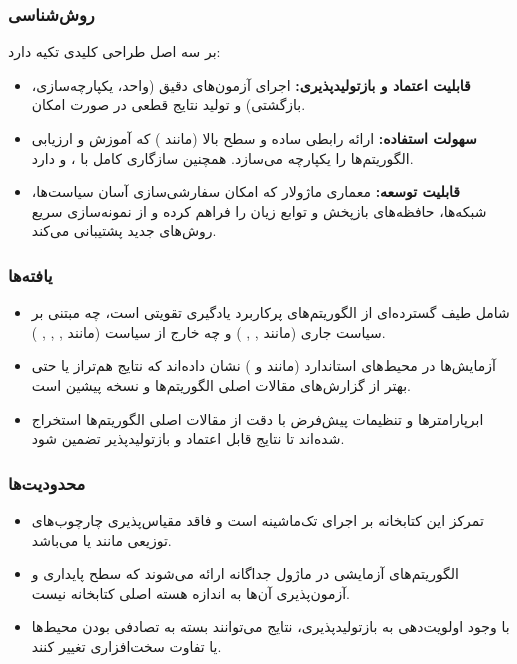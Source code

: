 \documentclass[12pt, a4paper]{report}
\begin{document}
\subsubsection{روش‌شناسی}
 بر سه اصل طراحی کلیدی تکیه دارد:
\begin{itemize}
    \item \textbf{قابلیت اعتماد و بازتولیدپذیری:} اجرای آزمون‌های دقیق (واحد، یکپارچه‌سازی، بازگشتی) و تولید نتایج قطعی در صورت امکان.
    \item \textbf{سهولت استفاده:} ارائه رابطی ساده و سطح بالا (مانند ) که آموزش و ارزیابی الگوریتم‌ها را یکپارچه می‌سازد. همچنین سازگاری کامل با ،  و  دارد.
    \item \textbf{قابلیت توسعه:} معماری ماژولار که امکان سفارشی‌سازی آسان سیاست‌ها، شبکه‌ها، حافظه‌های بازپخش و توابع زیان را فراهم کرده و از نمونه‌سازی سریع روش‌های جدید پشتیبانی می‌کند.
\end{itemize}

\subsubsection{یافته‌ها}
\begin{itemize}
    \item {} شامل طیف گسترده‌ای از الگوریتم‌های پرکاربرد یادگیری تقویتی است، چه مبتنی بر سیاست جاری (مانند , , ) و چه خارج از سیاست (مانند , , , ).  
    \item آزمایش‌ها در محیط‌های استاندارد (مانند  و ) نشان داده‌اند که نتایج  هم‌تراز یا حتی بهتر از گزارش‌های مقالات اصلی الگوریتم‌ها و نسخه پیشین  است.  
    \item ابرپارامترها و تنظیمات پیش‌فرض با دقت از مقالات اصلی الگوریتم‌ها استخراج شده‌اند تا نتایج قابل اعتماد و بازتولیدپذیر تضمین شود.  
\end{itemize}

\subsubsection{محدودیت‌ها}
\begin{itemize}
    \item تمرکز این کتابخانه بر اجرای تک‌ماشینه است و فاقد مقیاس‌پذیری چارچوب‌های توزیعی مانند  یا  می‌باشد.  
    \item الگوریتم‌های آزمایشی در ماژول جداگانه  ارائه می‌شوند که سطح پایداری و آزمون‌پذیری آن‌ها به اندازه هسته اصلی کتابخانه نیست.  
    \item با وجود اولویت‌دهی به بازتولیدپذیری، نتایج می‌توانند بسته به تصادفی بودن محیط‌ها یا تفاوت سخت‌افزاری تغییر کنند.  
\end{itemize}
\end{document}
